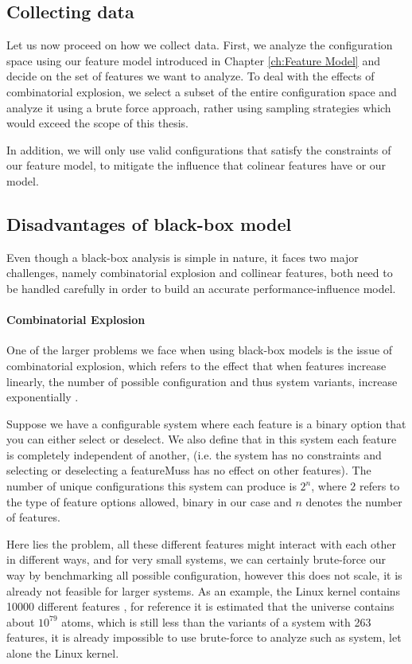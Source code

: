 \subsection{Collecting data}

Let us now proceed on how we collect data. First, we analyze the configuration space using our feature model introduced in Chapter \ref{ch:Feature Model}
and decide on the set of features we want to analyze. To deal with the effects of combinatorial explosion, we select a subset of the entire
configuration space and analyze it using a brute force approach, rather using sampling strategies which would exceed the scope of this
thesis.

In addition, we will only use valid configurations that satisfy the constraints of our feature model, to mitigate
the influence that colinear features have or our model.

\subsection{Disadvantages of black-box model}
Even though a black-box analysis is simple in nature, it faces two major challenges, namely combinatorial explosion and collinear features, both need to be
handled carefully in order to build an accurate performance-influence model.

\paragraph{Combinatorial Explosion}
One of the larger problems we face when using black-box models is the issue of combinatorial explosion, 
which refers to the effect that when features increase linearly, the number of possible configuration and thus system variants,
increase exponentially \cite{Combinatorial-explosion}.

Suppose we have a configurable system where each feature is a binary option that you can either select or deselect. We also define 
that in this system each feature is completely independent of another, (i.e. the system has no constraints and selecting or deselecting a featureMuss
has no effect on other features). The number of unique configurations this system can produce is $2^n$, where $2$ refers to
the type of feature options allowed, binary in our case and $n$ denotes the number of features. 

Here lies the problem, all these different features might interact with each other in different ways, and for very small systems,
we can certainly brute-force our way by benchmarking all possible configuration, however this does not scale, it is already not feasible for 
larger systems. As an example, the Linux kernel contains 10000 different features \cite{Linux-Kernel}, for reference it is estimated that the universe
contains about $10^79$ atoms, which is still less than the variants of a system with 263 features, it is already impossible to use brute-force to analyze
such as system, let alone the Linux kernel.

